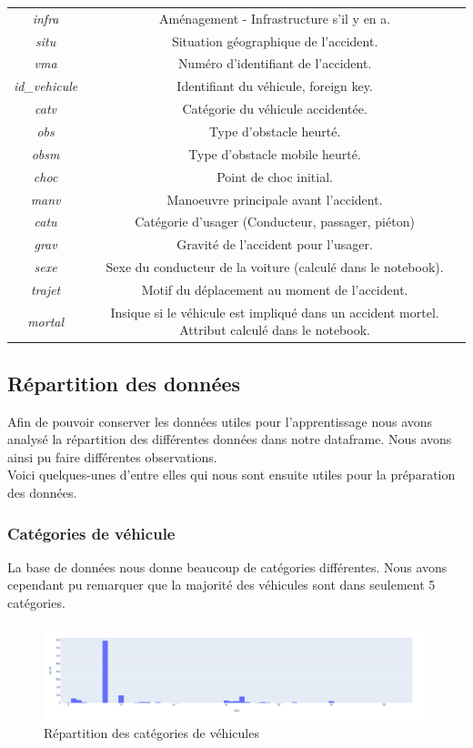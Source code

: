 \documentclass[]{article}
\begin{document}
\begin{center}
\begin{tabular}{ |c|c| }
            \textit{infra} & Aménagement - Infrastructure s'il y en a. \\  
            \textit{situ} & Situation géographique de l'accident. \\  
            \textit{vma} & Numéro d'identifiant de l'accident. \\
            \textit{id\_vehicule} & Identifiant du véhicule, foreign key. \\
            \textit{catv} & Catégorie du véhicule accidentée. \\  
            \textit{obs} & Type d'obstacle heurté. \\
            \textit{obsm} & Type d'obstacle mobile heurté. \\
            \textit{choc} & Point de choc initial. \\
            \textit{manv} & Manoeuvre principale avant l'accident. \\
            \textit{catu} & Catégorie d'usager (Conducteur, passager, piéton) \\
            \textit{grav} & Gravité de l'accident pour l'usager. \\
            \textit{sexe} & Sexe du conducteur de la voiture (calculé dans le notebook). \\
            \textit{trajet} & Motif du déplacement au moment de l’accident. \\
            \textit{mortal} & Insique si le véhicule est impliqué dans un accident mortel. Attribut calculé dans le notebook. \\
            \hline
        \end{tabular}
    \end{center}

    \subsection{Répartition des données}
    Afin de pouvoir conserver les données utiles pour l'apprentissage nous avons analysé la répartition des 
    différentes données dans notre dataframe.
    Nous avons ainsi pu faire différentes observations. 
    \\
    Voici quelques-unes d'entre elles qui nous sont ensuite
    utiles pour la préparation des données.
    \subsubsection{Catégories de véhicule}
    La base de données nous donne beaucoup de catégories différentes. Nous avons cependant pu remarquer 
    que la majorité des véhicules sont dans seulement 5 catégories.
    \begin{figure}[ht]
        \centering
        \includegraphics[width=12cm]{./img/catv1.png}
        \caption{Répartition des catégories de véhicules}
    \end{figure}
\end{document}
